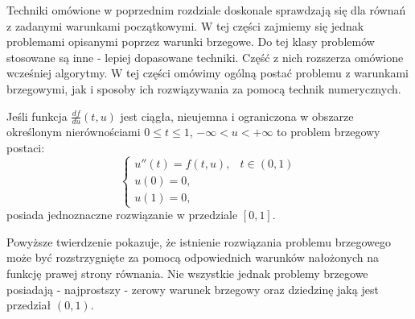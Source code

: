 Techniki omówione w poprzednim rozdziale doskonale sprawdzają się dla równań z zadanymi warunkami początkowymi. W tej części zajmiemy się jednak problemami opisanymi poprzez warunki brzegowe. Do tej klasy problemów stosowane są inne - lepiej dopasowane techniki. Część z nich rozszerza omówione wcześniej algorytmy. W tej części omówimy ogólną postać problemu z warunkami brzegowymi, jak i sposoby ich rozwiązywania za pomocą technik numerycznych. 


\begin{theorem}
Jeśli funkcja $\frac{df}{du}(t,u)$ jest ciągła, nieujemna i ograniczona w obszarze określonym nierównościami $0\leq t \leq 1$, $-\infty < u < +\infty$ to problem brzegowy postaci:
\begin{equation}\label{zagad_brzeg}
\left\{\begin{array}{ll}
u''(t)=f(t,u), & t \in (0,1) \\
u(0)=0, & \\
u(1)=0,
\end{array}\right.
\end{equation}
posiada jednoznaczne rozwiązanie w przedziale $[0,1]$.
\end{theorem}
Powyższe twierdzenie pokazuje, że istnienie rozwiązania problemu brzegowego może być rozstrzygnięte za pomocą odpowiednich warunków nałożonych na funkcję prawej strony równania. Nie wszystkie jednak problemy brzegowe posiadają - najprostszy - zerowy warunek brzegowy oraz dziedzinę jaką jest przedział $(0,1)$. 

